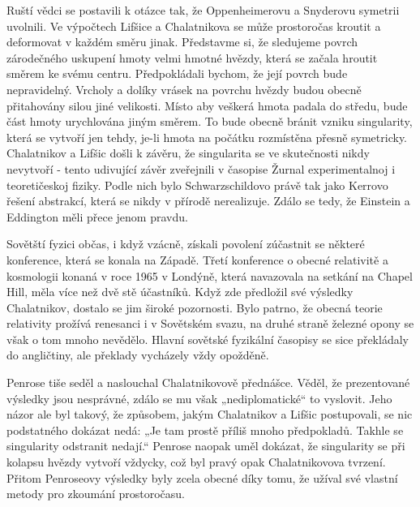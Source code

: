   Ruští vědci se postavili k otázce tak, že Oppenheimerovu a Snyderovu symetrii uvolnili. Ve
  výpočtech Lifšice a Chalatnikova se může prostoročas kroutit a deformovat v každém směru jinak.
  Představme si, že sledujeme povrch zárodečného uskupení hmoty velmi hmotné hvězdy, která se začala
  hroutit směrem ke svému centru. Předpokládali bychom, že její povrch bude nepravidelný. Vrcholy a
  dolíky vrásek na povrchu hvězdy budou obecně přitahovány silou jiné velikosti. Místo aby veškerá
  hmota padala do středu, bude část hmoty urychlována jiným směrem. To bude obecně bránit vzniku
  singularity, která se vytvoří jen tehdy, je-li hmota na počátku rozmístěna přesně symetricky.
  Chalatnikov a Lifšic došli k závěru, že singularita se ve skutečnosti nikdy nevytvoří - tento
  udivující závěr zveřejnili v časopise Žurnal experimentalnoj i teoretičeskoj fiziky. Podle nich
  bylo Schwarzschildovo právě tak jako Kerrovo řešení abstrakcí, která se nikdy v přírodě
  nerealizuje. Zdálo se tedy, že Einstein a Eddington měli přece jenom pravdu. 

  Sovětští fyzici občas, i když vzácně, získali povolení zúčastnit se některé konference, která se
  konala na Západě. Třetí konference o obecné relativitě a kosmologii konaná v roce 1965 v Londýně,
  která navazovala na setkání na Chapel Hill, měla více než dvě stě účastníků. Když zde předložil
  své výsledky Chalatnikov, dostalo se jim široké pozornosti. Bylo patrno, že obecná teorie
  relativity prožívá renesanci i v Sovětském svazu, na druhé straně železné opony se však o tom
  mnoho nevědělo. Hlavní sovětské fyzikální časopisy se sice překládaly do angličtiny, ale překlady
  vycházely vždy opožděně. 

  Penrose tiše seděl a naslouchal Chalatnikovově přednášce. Věděl, že prezentované výsledky jsou
  nesprávné, zdálo se mu však „nediplomatické“ to vyslovit. Jeho názor ale byl takový, že způsobem,
  jakým Chalatnikov a Lifšic postupovali, se nic podstatného dokázat nedá: „Je tam prostě příliš
  mnoho předpokladů. Takhle se singularity odstranit nedají.“ Penrose naopak uměl dokázat, že
  singularity se při kolapsu hvězdy vytvoří vždycky, což byl pravý opak Chalatnikovova tvrzení.
  Přitom Penroseovy výsledky byly zcela obecné díky tomu, že užíval své vlastní metody pro zkoumání
  prostoročasu. 

